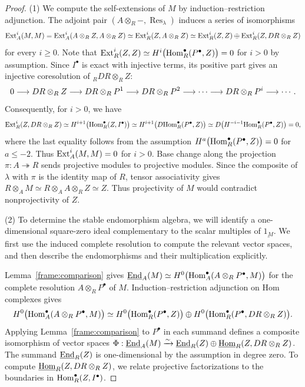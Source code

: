 \documentclass[11pt]{article}
\begin{document}
\begin{proof}
\smallskip\noindent
\textup{(1)} We compute the self-extensions of $M$ by
induction--restriction adjunction.
The adjoint pair
$(A\otimes_R-, \operatorname{Res}_\lambda)$ induces a series of isomorphisms
$${\rm Ext}_A^i(M,M)={\rm Ext}_A^i(A\otimes_RZ, A\otimes_RZ)\simeq {\rm Ext}_R^i(Z, A\otimes_RZ)\simeq {\rm Ext}_R^i(Z, Z)\oplus {\rm Ext}_R^i(Z, DR\otimes_RZ)$$ for every $i\ge 0$.
Note that ${\rm Ext}_R^i(Z,Z)\simeq H^i\big({\rm Hom}_R^\bullet(P^\bullet,Z)\big)=0$ for $i>0$ by assumption.
Since $I^\bullet$ is exact with injective terms, its positive part gives
an injective coresolution of ${_R}DR\otimes_RZ$:
$$
0\longrightarrow DR\otimes_RZ\longrightarrow DR\otimes_RP^1\longrightarrow DR\otimes_RP^2\longrightarrow\cdots\longrightarrow DR\otimes_RP^i\longrightarrow\cdots.
$$
Consequently, for $i>0$, we have
\begin{equation*}
 {\rm Ext}_R^i(Z,DR\otimes_RZ)\simeq H^{i+1}\big({\rm Hom}_R^\bullet(Z,I^\bullet)\big)
 \simeq H^{i+1}\big(D{\rm Hom}_R^\bullet(P^\bullet, Z)\big)\simeq D\big(H^{-i-1}{\rm Hom}_R^\bullet(P^\bullet,Z)\big)=0,
\end{equation*}
where the last equality follows from the assumption $H^a\big({\rm Hom}_R^\bullet(P^\bullet,Z)\big)=0$ for $a\le-2$.
Thus ${\rm Ext}_A^i(M,M)=0$ for $i>0$.
Base change along the projection $\pi: A\twoheadrightarrow R$ sends projective modules to
projective modules. Since the composite of $\lambda$ with $\pi$ is the identity map of $R$, tensor associativity gives $R\otimes_AM\simeq R\otimes_AA\otimes_RZ\simeq Z$.
Thus projectivity of $M$ would contradict nonprojectivity of $Z$.

\smallskip\noindent
\textup{(2)} To determine the stable endomorphism algebra, we will
identify a one-dimensional square-zero ideal complementary to the
scalar multiples of $\underline{1_M}$. We first use the induced complete
resolution to compute the relevant vector spaces, and then describe
the endomorphisms and their multiplication explicitly.

Lemma~\ref{frame:comparison} gives
\mbox{$\underline{{\rm End}}_A(M)\simeq
H^0\big({\rm Hom}_A^\bullet(A\otimes_RP^\bullet,M)\big)$}
for the complete resolution $A\otimes_RP^\bullet$ of $M$.
Induction--restriction adjunction on Hom complexes gives
\[
 H^0\big({\rm Hom}_A^\bullet(A\otimes_RP^\bullet,M)\big)
 \simeq H^0\big({\rm Hom}_R^\bullet(P^\bullet,Z)\big)
 \oplus H^0\big({\rm Hom}_R^\bullet(P^\bullet,DR\otimes_RZ)\big).
\]
Applying Lemma~\ref{frame:comparison} to $P^\bullet$ in each
summand defines a composite isomorphism of vector spaces
\mbox{$\Phi:\underline{{\rm End}}_A(M)\xrightarrow{\sim}
\underline{{\rm End}}_R(Z)\oplus\underline{{\rm Hom}}_R(Z,DR\otimes_RZ)$}.
The summand $\underline{{\rm End}}_R(Z)$ is one-dimensional by the
assumption in degree zero. To compute
$\underline{{\rm Hom}}_R(Z,DR\otimes_RZ)$, we relate projective
factorizations to the boundaries in ${\rm Hom}_R^\bullet(Z,I^\bullet)$.


\end{proof}
\end{document}
